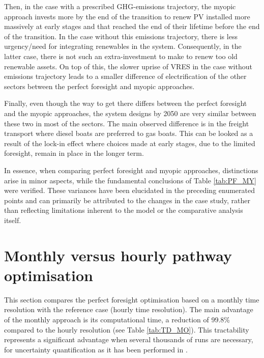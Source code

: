 Then, in the case with a prescribed \gls{GHG}-emissions trajectory, the myopic approach invests more by the end of the transition to renew \gls{PV} installed more massively at early stages and that reached the end of their lifetime before the end of the transition. In the case without this emissions trajectory, there is less urgency/need for integrating renewables in the system. Consequently, in the latter case, there is not such an extra-investment to make to renew too old renewable assets. On top of this, the slower uprise of \gls{VRES} in the case without emissions trajectory leads to a smaller difference of electrification of the other sectors between the perfect foresight and myopic approaches.

Finally, even though the way to get there differs between the perfect foresight and the myopic approaches, the system designs by 2050 are very similar between these two in most of the sectors. The main observed difference is in the freight transport where diesel boats are preferred to gas boats. This can be looked as a result of the lock-in effect where choices made at early stages, due to the limited foresight, remain in place in the longer term. 

In essence, when comparing perfect foresight and myopic approaches, distinctions arise in minor aspects, while the fundamental conclusions of Table \ref{tab:PF_MY} were verified. These variances have been elucidated in the preceding enumerated points and can primarily be attributed to the changes in the case study, rather than reflecting limitations inherent to the model or the comparative analysis itself.

\section{Monthly versus hourly pathway optimisation}
\label{app:mo_vs_td}

This section compares the perfect foresight optimisation based on a monthly time resolution with the reference case (hourly time resolution). The main advantage of the monthly approach is its computational time, \ie a reduction of 99.8\% compared to the hourly resolution (see Table \ref{tab:TD_MO}). This tractability represents a significant advantage when several thousands of runs are necessary, \eg for uncertainty quantification as it has been performed in \cite{rixhon2021role}.


